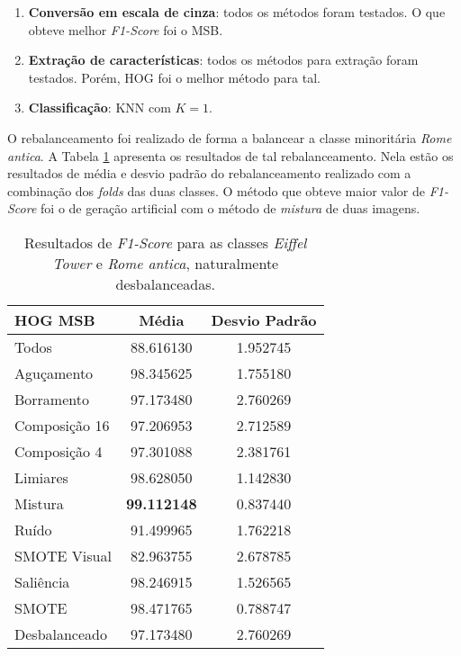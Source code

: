 \begin{enumerate}
\item \textbf{Conversão em escala de cinza}: todos os métodos foram testados. O que obteve melhor \textit{F1-Score} foi o MSB.
\item \textbf{Extração de características}: todos os métodos para extração foram testados. Porém, HOG foi o melhor método para tal.
\item \textbf{Classificação}: KNN com $K=1$.
\end{enumerate}


O rebalanceamento foi realizado de forma a balancear a classe minoritária \textit{Rome antica}. A Tabela \ref{tab:resultados:4.1} apresenta os resultados de tal rebalanceamento. Nela estão os resultados de média e desvio padrão do rebalanceamento realizado com a combinação dos \textit{folds} das duas classes. O método que obteve maior valor de \textit{F1-Score} foi o de geração artificial com o método de \emph{mistura} de duas imagens.

\begin{table}[H]
\begin{center}
\caption{Resultados de \textit{F1-Score} para as classes \textit{Eiffel Tower} e \textit{Rome antica}, naturalmente desbalanceadas.}
\label{tab:resultados:4.1}
\begin{tabular}{|l|c|c|}
\hline
\textbf{HOG MSB} & \textbf{Média}     & \textbf{Desvio Padrão} \\ \hline
   Todos        &  88.616130 &  1.952745  \\ \hline
  Aguçamento    &  98.345625 &  1.755180  \\ \hline
  Borramento    &  97.173480 &  2.760269  \\ \hline
  Composição 16 &  97.206953 &  2.712589  \\ \hline
  Composição 4  &  97.301088 &  2.381761  \\ \hline
  Limiares      &  98.628050 &  1.142830  \\ \hline
  Mistura       &  \textbf{99.112148} &  0.837440  \\ \hline
  Ruído         &  91.499965 &  1.762218  \\ \hline
  SMOTE Visual  &  82.963755 &  2.678785  \\ \hline
  Saliência     &  98.246915 &  1.526565  \\ \hline
 SMOTE          &  98.471765 &  0.788747  \\ \hline
Desbalanceado   &  97.173480 &  2.760269  \\ \hline
\end{tabular}
\end{center}
\end{table}

